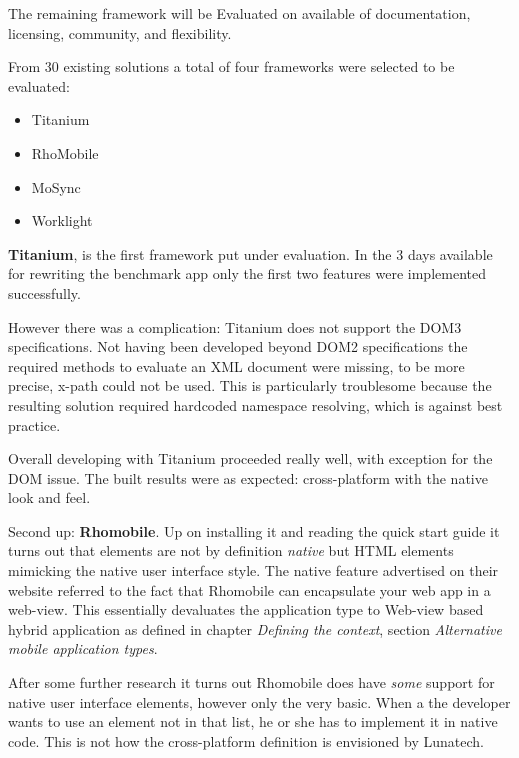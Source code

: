 The remaining framework will be Evaluated on available of documentation, licensing, community, and flexibility.

From 30 existing solutions a total of four frameworks were selected to be evaluated:
\begin{itemize}
	\item Titanium
	\item RhoMobile
	\item MoSync
	\item Worklight
\end{itemize}

{\bf Titanium}, is the first framework put under evaluation. In the 3 days available for rewriting the benchmark app only the first two features were implemented successfully.

However there was a complication: Titanium does not support the DOM3 specifications. Not having been developed beyond DOM2 specifications the required methods to evaluate an XML document were missing, to be more precise, x-path could not be used. This is particularly troublesome because the resulting solution required hardcoded namespace resolving, which is against best practice. %

Overall developing with Titanium proceeded really well, with exception for the DOM issue. The built results were as expected: cross-platform with the native look and feel.

Second up: {\bf Rhomobile}. Up on installing it and reading the quick start guide it turns out that elements are not by definition \emph{native} but HTML elements mimicking the native user interface style. The native feature advertised on their website referred to the fact that Rhomobile can encapsulate your web app in a web-view. This essentially devaluates the application type to Web-view based hybrid application as defined in chapter \emph{Defining the context}, section \emph{Alternative mobile application types}.

After some further research it turns out Rhomobile does have \emph{some} support for native user interface elements, however only the very basic. When a the developer wants to use an element not in that list, he or she has to implement it in native code. \cite{Rhomobile2012} This is not how the cross-platform definition is envisioned by Lunatech.

